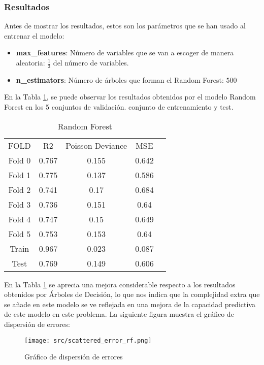 \subsubsection*{Resultados}
Antes de mostrar los resultados, estos son los parámetros que se han usado al entrenar el modelo:
\begin{itemize}
	\item \textbf{max\_features}: Número de variables que se van a escoger de manera aleatoria: $\frac{1}{3}$ del número de variables.
	\item\textbf{n\_estimators}: Número de árboles que forman el Random Forest: $500$
\end{itemize}
En la Tabla  \ref{tab:res_random_forest}, se puede observar los resultados obtenidos por el modelo Random Forest en los 5 conjuntos de validación. conjunto de entrenamiento y test.
\begin{table}[H]
	\centering
	\begin{tabular}{|c|c|c|c|c}
		\cline{1-4}
		FOLD   & R2    & Poisson Deviance & MSE   \\ \cline{1-4}
		Fold 0 & 0.767 & 0.155            & 0.642 \\ \cline{1-4}
		Fold 1 & 0.775 & 0.137            & 0.586 \\ \cline{1-4}
		Fold 2 & 0.741 & 0.17             & 0.684 \\ \cline{1-4}
		Fold 3 & 0.736 & 0.151            & 0.64  \\ \cline{1-4}
		Fold 4 & 0.747 & 0.15             & 0.649 \\ \cline{1-4}
		Fold 5 & 0.753 & 0.153            & 0.64  \\ \cline{1-4}
		Train  & 0.967 & 0.023            & 0.087 \\ \cline{1-4}
		Test   & 0.769 & 0.149            & 0.606 \\ \cline{1-4}
	\end{tabular}
	\caption{Random Forest}
	\label{tab:res_random_forest}
\end{table}
En la Tabla  \ref{tab:res_random_forest} se aprecia una mejora considerable respecto a los resultados obtenidos por Árboles de Decisión, lo que nos indica que la complejidad extra que se añade en este modelo se ve reflejada en una mejora de la capacidad predictiva de este modelo en este problema.
\clearpage
La siguiente figura muestra el gráfico de dispersión de errores:
\begin{figure}[H]
	\centering
	\texttt{[image: src/scattered\_error\_rf.png]}
	\caption{Gráfico de dispersión de errores}
	\label{fig:rf_scattered}
\end{figure}
